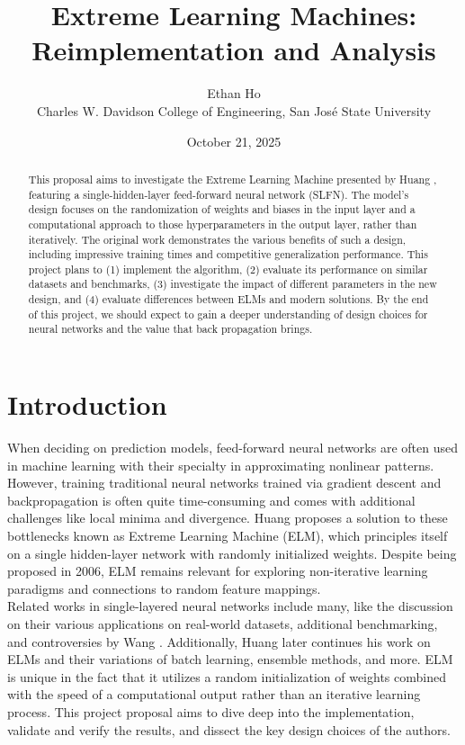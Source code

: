 \documentclass[12pt]{article}
\title{Extreme Learning Machines: \\Reimplementation and Analysis}
\author{Ethan Ho\\
Charles W. Davidson College of Engineering, San José State University}
\date{October 21, 2025}
\begin{document}
\maketitle

\begin{abstract}
This proposal aims to investigate the Extreme Learning Machine presented by Huang \cite{huang2006extreme}, featuring a single-hidden-layer feed-forward neural network (SLFN). The model's design focuses on the randomization of weights and biases in the input layer and a computational approach to those hyperparameters in the output layer, rather than iteratively. The original work demonstrates the various benefits of such a design, including impressive training times and competitive generalization performance. This project plans to (1) implement the algorithm, (2) evaluate its performance on similar datasets and benchmarks, (3) investigate the impact of different parameters in the new design, and (4) evaluate differences between ELMs and modern solutions. By the end of this project, we should expect to gain a deeper understanding of design choices for neural networks and the value that back propagation brings.
\end{abstract}

\section{Introduction}
When deciding on prediction models, feed-forward neural networks are often used in machine learning with their specialty in approximating nonlinear patterns. However, training traditional neural networks trained via gradient descent and backpropagation is often quite time-consuming and comes with additional challenges like local minima and divergence. Huang \cite{huang2006extreme} proposes a solution to these bottlenecks known as Extreme Learning Machine (ELM), which principles itself on a single hidden-layer network with randomly initialized weights. Despite being proposed in 2006, ELM remains relevant for exploring non-iterative learning paradigms and connections to random feature mappings. \\

Related works in single-layered neural networks include many, like the discussion on their various applications on real-world datasets, additional benchmarking, and controversies by Wang \cite{wang2022review}. Additionally, Huang \cite{huang2011extreme} later continues his work on ELMs and their variations of batch learning, ensemble methods, and more. ELM is unique in the fact that it utilizes a random initialization of weights combined with the speed of a computational output rather than an iterative learning process. This project proposal aims to dive deep into the implementation, validate and verify the results, and dissect the key design choices of the authors.
\end{document}

